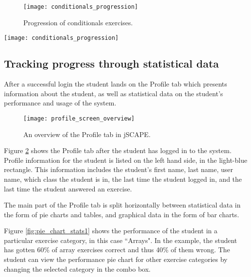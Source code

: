 \begin{figure}[H]
\centering
\texttt{[image: conditionals\_progression]}
\caption{Progression of conditionals exercises.}
\label{fig:conditionals_progression}
\end{figure}

\begin{sidewaysfigure}
\centering
\texttt{[image: conditionals\_progression]}
\caption{Progression of conditionals exercises.}
\label{fig:conditionals_progression}
\end{sidewaysfigure}

\subsection{Tracking progress through statistical data}
\label{subsec:tracking-progress}
After a successful login the student lands on the Profile tab which presents information about the student, as well as statistical data on the student's performance and usage of the system.

\begin{figure}[H]
\centering
\texttt{[image: profile\_screen\_overview]}
\caption{An overview of the Profile tab in jSCAPE.}
\label{fig:profile_screen_overview}
\end{figure}

Figure \ref{fig:profile_screen_overview} shows the Profile tab after the student has logged in to the system. Profile information for the student is listed on the left hand side, in the light-blue rectangle. This information includes the student's first name, last name, user name, which class the student is in, the last time the student logged in, and the last time the student answered an exercise. \newline

The main part of the Profile tab is split horizontally between statistical data in the form of pie charts and tables, and graphical data in the form of bar charts. \newline

Figure \ref{fig:pie_chart_stats1} shows the performance of the student in a particular exercise category, in this case ``Arrays". In the example, the student has gotten 60\% of array exercises correct and thus 40\% of them wrong. The student can view the performance pie chart for other exercise categories by changing the selected category in the combo box.

